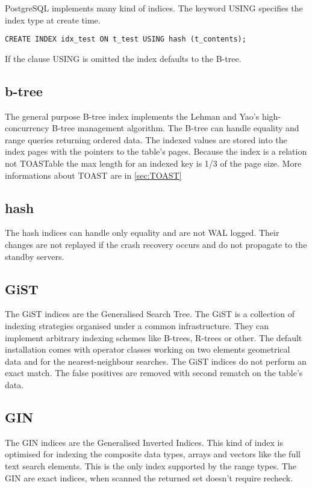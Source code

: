 PostgreSQL implements many kind of indices. The keyword USING specifies the index type at create time.

\begin{lstlisting}[style=pgsql]
 CREATE INDEX idx_test ON t_test USING hash (t_contents);
\end{lstlisting}

If the clause USING is omitted the index defaults to the B-tree.

\subsection{b-tree}
The general purpose B-tree index implements the Lehman and Yao's
high-concurrency B-tree management algorithm. The B-tree can handle equality and range queries 
returning ordered data. The indexed values are stored into the index pages with the pointers to the
table's pages. Because the index is a relation not TOASTable the max length for an indexed key is 1/3
of the page size. More informations about TOAST are in \ref{sec:TOAST} \newline

\subsection{hash}
The hash indices can handle only equality and are not WAL logged. Their changes
are not replayed if the crash recovery occurs and do not propagate to the standby servers.\newline

\subsection{GiST}
The GiST indices are the Generalised Search Tree. The GiST is a collection of
indexing strategies organised under a common infrastructure. They can implement arbitrary indexing
schemes like B-trees, R-trees  or other. The default installation comes with operator classes working on 
two elements geometrical data and for the nearest-neighbour searches. The GiST indices do not perform an
exact match. The false positives are removed with second rematch on the table's data.\newline

\subsection{GIN}
The GIN indices  are the Generalised Inverted Indices. This kind of index
is optimised for indexing the composite data types, arrays and vectors like the full text search
elements. This is the only index supported by the range types. The GIN are exact indices, when scanned
the returned set doesn't require recheck.

